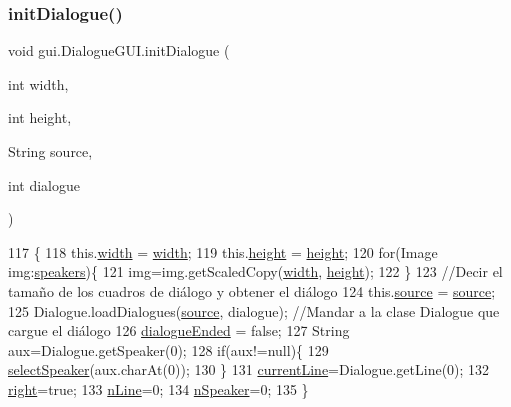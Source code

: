 \subsubsection{\texorpdfstring{init\+Dialogue()}{initDialogue()}}
{\footnotesize\ttfamily void gui.\+Dialogue\+G\+U\+I.\+init\+Dialogue (\begin{DoxyParamCaption}\item[{int}]{width,  }\item[{int}]{height,  }\item[{String}]{source,  }\item[{int}]{dialogue }\end{DoxyParamCaption})\hspace{0.3cm}{\ttfamily [inline]}}


\begin{DoxyCode}
117                                                                                  \{
118         this.\mbox{\hyperlink{classgui_1_1_dialogue_g_u_i_a62770f57482703fba82e5e885b8f60cc}{width}} = \mbox{\hyperlink{classgui_1_1_dialogue_g_u_i_a62770f57482703fba82e5e885b8f60cc}{width}};
119         this.\mbox{\hyperlink{classgui_1_1_dialogue_g_u_i_a41a3d504adf0501b3c0b15ce1f046fa8}{height}} = \mbox{\hyperlink{classgui_1_1_dialogue_g_u_i_a41a3d504adf0501b3c0b15ce1f046fa8}{height}};
120         \textcolor{keywordflow}{for}(Image img:\mbox{\hyperlink{classgui_1_1_dialogue_g_u_i_a11fc12409bfacfca3a0544bd49a75035}{speakers}})\{
121             img=img.getScaledCopy(\mbox{\hyperlink{classgui_1_1_dialogue_g_u_i_a62770f57482703fba82e5e885b8f60cc}{width}}, \mbox{\hyperlink{classgui_1_1_dialogue_g_u_i_a41a3d504adf0501b3c0b15ce1f046fa8}{height}});
122         \}
123         \textcolor{comment}{//Decir el tamaño de los cuadros de diálogo y obtener el diálogo}
124         this.\mbox{\hyperlink{classgui_1_1_dialogue_g_u_i_ae6b546f672ac2bbfc0a9f5105ce9e2a9}{source}} = \mbox{\hyperlink{classgui_1_1_dialogue_g_u_i_ae6b546f672ac2bbfc0a9f5105ce9e2a9}{source}};
125         Dialogue.loadDialogues(\mbox{\hyperlink{classgui_1_1_dialogue_g_u_i_ae6b546f672ac2bbfc0a9f5105ce9e2a9}{source}}, dialogue);   \textcolor{comment}{//Mandar a la clase Dialogue que cargue el
       diálogo}
126         \mbox{\hyperlink{classgui_1_1_dialogue_g_u_i_a0ce37741e9f2b0ad3a749977fe9a1477}{dialogueEnded}} = \textcolor{keyword}{false};
127         String aux=Dialogue.getSpeaker(0);
128         \textcolor{keywordflow}{if}(aux!=null)\{
129             \mbox{\hyperlink{classgui_1_1_dialogue_g_u_i_a69d754e37de68f81fdffadda6b4c8b63}{selectSpeaker}}(aux.charAt(0));
130         \}
131         \mbox{\hyperlink{classgui_1_1_dialogue_g_u_i_a44a2c9abf9ce5527b307a1828266d199}{currentLine}}=Dialogue.getLine(0);
132         \mbox{\hyperlink{classgui_1_1_dialogue_g_u_i_ac2baedad2d743cda7bc77fcb71ad1466}{right}}=\textcolor{keyword}{true};
133         \mbox{\hyperlink{classgui_1_1_dialogue_g_u_i_a1270df90f92a6329173e530568d8a81d}{nLine}}=0;
134         \mbox{\hyperlink{classgui_1_1_dialogue_g_u_i_ac78eeb2127202391a39c827cee6dfd2f}{nSpeaker}}=0;
135     \}
\end{DoxyCode}
